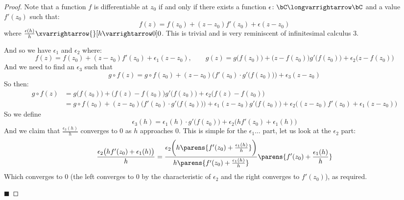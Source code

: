 \documentclass[10pt]{article}
\begin{document}
\begin{proof}

    Note that a function $f$ is differentiable at $z_0$ if and only if there exists a function $\epsilon\colon\bC\longvarrightarrow\bC$ and a value $f'(z_0)$ such that:
    \[ f(z) = f(z_0) + (z-z_0)f'(z_0) + \epsilon(z-z_0) \]
    where $\frac{\epsilon(h)}h\xvarrightarrow{}[h\varrightarrow0]0$.
    This is trivial and is very reminiscent of infinitesimal calculus $3$.

    And so we have $\epsilon_1$ and $\epsilon_2$ where:
    \[ f(z) = f(z_0) + (z-z_0)f'(z_0) + \epsilon_1(z-z_0),\qquad g(z) = g\bigl(f(z_0)\bigr) + \bigl(z-f(z_0)\bigr)g'\bigl(f(z_0)\bigr) + \epsilon_2\bigl(z-f(z_0)\bigr) \]
    And we need to find an $\epsilon_3$ such that
    \[ g\circ f(z) = g\circ f(z_0) + (z-z_0)\biggl(f'(z_0)\cdot g'\bigl(f(z_0)\bigr)\biggr) + \epsilon_3(z-z_0) \] 
    So then:
    \begin{align*}
        g\circ f(z) &= g\bigl(f(z_0)\bigr) + \bigl(f(z)-f(z_0)\bigr)g'\bigl(f(z_0)\bigr) + \epsilon_2\bigl(f(z)-f(z_0)\bigr) \\
                    &= g\circ f(z_0) + (z-z_0)\biggl(f'(z_0)\cdot g'\bigl(f(z_0)\bigr)\biggr) + \epsilon_1(z-z_0)g'\bigl(f(z_0)\bigr) + \epsilon_2\bigl((z-z_0)f'(z_0) + \epsilon_1(z-z_0)\bigr)
    \end{align*}
    So we define
    \[ \epsilon_3(h) = \epsilon_1(h)\cdot g'\bigl(f(z_0)\bigr) + \epsilon_2\bigl(hf'(z_0) + \epsilon_1(h)\bigr) \]
    And we claim that $\frac{\epsilon_3(h)}h$ converges to $0$ as $h$ approaches $0$.
    This is simple for the $\epsilon_1\dots$ part, let us look at the $\epsilon_2$ part:
    \[ \frac{\epsilon_2\bigl(hf'(z_0) + \epsilon_1(h)\bigr)}h = \frac{\epsilon_2\biggl(h\parens{f'(z_0)+\frac{\epsilon_1(h)}h}\biggr)}{h\parens{f'(z_0)+\frac{\epsilon_1(h)}h}}
       \parens{f'(z_0)+\frac{\epsilon_1(h)}h} \]
    Which converges to $0$ (the left converges to $0$ by the characteristic of $\epsilon_2$ and the right converges to $f'(z_0)$), as required.

    \hfill$\blacksquare$

\end{proof}
\end{document}
